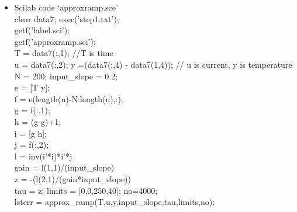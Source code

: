 \documentclass[12pt,prb]{article}
\begin{document}
\begin{itemize}
\item  Scilab code \textquoteleft approx\textunderscore ramp.sce\textquoteright
\vspace{0.5cm}\\ \textrightarrow clear data7; exec('step1.txt');\\
\textrightarrow getf('label.sci');\\
\textrightarrow getf('approx\textunderscore ramp.sci');\\
\textrightarrow T = data7(:,1); //T is time\\
\textrightarrow u = data7(:,2); y =(data7(:,4) - data7(1,4)); // u is current, y is temperature\\
\textrightarrow N = 200; input\_slope = 0.2;\\
\textrightarrow e = [T y];\\
\textrightarrow f = e(length(u)-N:length(u),:);\\
\textrightarrow g = f(:,1);\\
\textrightarrow h = (g-g)+1;\\
\textrightarrow i = [g h];\\
\textrightarrow j = f(:,2);\\
\textrightarrow l = inv(i'*i)*i'*j\\
\textrightarrow gain = l(1,1)/(input\_slope)\\
\textrightarrow z = -(l(2,1)/(gain*input\_slope))\\
\textrightarrow tau = z; limits = [0,0,250,40]; no=4000;\\
\textrightarrow lsterr = approx\_ramp(T,u,y,input\_slope,tau,limits,no);\\
\end{itemize}
\end{document}

